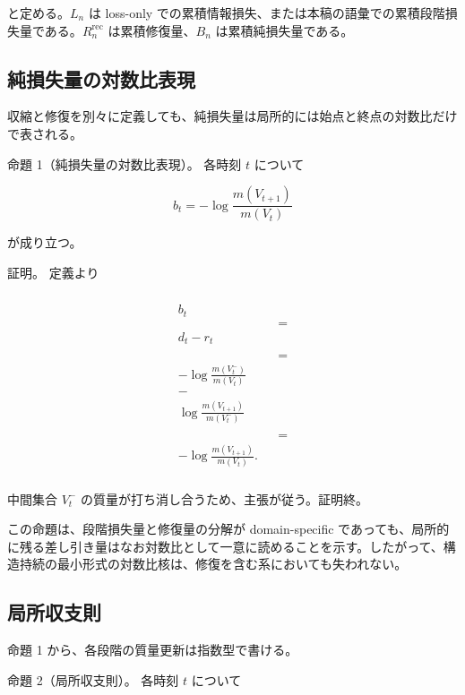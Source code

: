 \documentclass[12pt,a4paper]{article}
\begin{document}
と定める。\(L_{n}\) は loss-only での累積情報損失、または本稿の語彙での累積段階損失量である。\(R_{n}^{\mathrm{rec}}\) は累積修復量、\(B_{n}\) は累積純損失量である。

\subsection{純損失量の対数比表現}\label{ux7d14ux640dux5931ux91cfux306eux5bfeux6570ux6bd4ux8868ux73fe}

収縮と修復を別々に定義しても、純損失量は局所的には始点と終点の対数比だけで表される。

命題 1（純損失量の対数比表現）。 各時刻 \(t\) について

\[
b_{t} = -\log \frac{m(V_{t+1})}{m(V_{t})}
\]

が成り立つ。

証明。 定義より

\[
\begin{aligned}
\begin{aligned} \\
b_{t} \\
&&= \\
d_{t} - r_{t} \\ \\
&&= \\
-\log \frac{m(V_{t}^-)}{m(V_{t})} \\
- \\
\log \frac{m(V_{t+1})}{m(V_{t}^-)} \\ \\
&&= \\
-\log \frac{m(V_{t+1})}{m(V_{t})}. \\
\end{aligned}
\end{aligned}
\]

中間集合 \(V_{t}^-\) の質量が打ち消し合うため、主張が従う。証明終。

この命題は、段階損失量と修復量の分解が domain-specific であっても、局所的に残る差し引き量はなお対数比として一意に読めることを示す。したがって、構造持続の最小形式の対数比核は、修復を含む系においても失われない。

\subsection{局所収支則}\label{ux5c40ux6240ux53ceux652fux5247}

命題 1 から、各段階の質量更新は指数型で書ける。

命題 2（局所収支則）。 各時刻 \(t\) について
\end{document}
